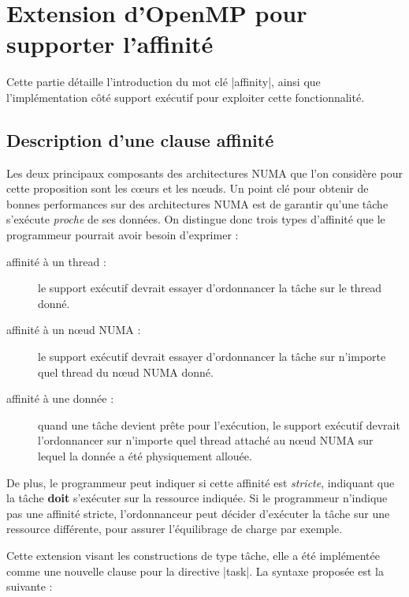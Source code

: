 \documentclass[parallelisme]{compas2017}
\begin{document}
\section{Extension d'OpenMP pour supporter l'affinité}
\label{sec:contributions}

Cette partie détaille l'introduction du mot clé |affinity|, ainsi que l'implémentation côté support
exécutif pour exploiter cette fonctionnalité.

\subsection{Description d'une clause affinité}

Les deux principaux composants des architectures NUMA que l'on considère pour
cette proposition sont les cœurs et les nœuds. Un point clé pour obtenir
de bonnes performances sur des architectures NUMA est de garantir qu'une tâche
s'exécute \emph{proche} de ses données.
On distingue donc trois types d'affinité que le programmeur pourrait avoir besoin
d'exprimer :

\begin{description}
    \item [affinité à un thread :]
      le support exécutif devrait essayer d'ordonnancer la tâche sur le thread donné.
       
    \item [affinité à un nœud NUMA :]
      le support exécutif devrait essayer d'ordonnancer la tâche sur n'importe
      quel thread du nœud NUMA donné.

    \item [affinité à une donnée :]
      quand une tâche devient prête pour l'exécution, le support exécutif devrait
      l'ordonnancer sur n'importe quel thread attaché au nœud NUMA sur lequel
      la donnée a été physiquement allouée.
\end{description}

De plus, le programmeur peut indiquer si cette affinité est \emph{stricte},
indiquant que la tâche \textbf{doit} s'exécuter sur la ressource indiquée.
Si le programmeur n'indique pas une affinité stricte, l'ordonnanceur peut décider
d'exécuter la tâche sur une ressource différente, pour assurer l'équilibrage de
charge par exemple.

Cette extension visant les constructions de type tâche, elle a été implémentée
comme une nouvelle clause pour la directive |task|. La syntaxe proposée est la
suivante :
\end{document}
